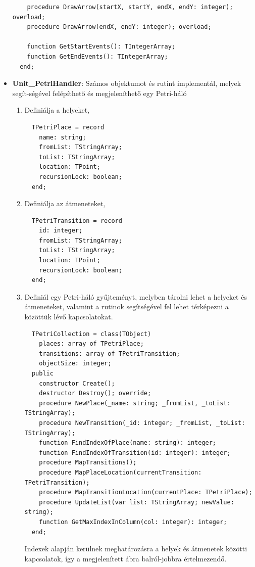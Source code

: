 \begin{itemize}
{\begin{lstlisting}
    procedure DrawArrow(startX, startY, endX, endY: integer); overload;
    procedure DrawArrow(endX, endY: integer); overload;

    function GetStartEvents(): TIntegerArray;
    function GetEndEvents(): TIntegerArray;
  end;

		\end{lstlisting}
	}
	\item{
		\textbf{Unit\_PetriHandler}: Számos objektumot és rutint implementál, melyek segít\hyp{}ségével felépíthető és megjeleníthető egy Petri-háló
		\begin{enumerate}
			\item{Definiálja a helyeket,
				\begin{lstlisting}
  TPetriPlace = record
    name: string;
    fromList: TStringArray;
    toList: TStringArray;
    location: TPoint;
    recursionLock: boolean;
  end;
				\end{lstlisting}
			}
			\item{Definiálja az átmeneteket,
				\begin{lstlisting}
  TPetriTransition = record
    id: integer;
    fromList: TStringArray;
    toList: TStringArray;
    location: TPoint;
    recursionLock: boolean;
  end;
				\end{lstlisting}
			}
			\item{Definiál egy Petri-háló gyűjteményt, melyben tárolni lehet a helyeket és átmeneteket, valamint a rutinok segítségével fel lehet térképezni a közöttük lévő kapcsolatokat.
				\begin{lstlisting}
  TPetriCollection = class(TObject)
    places: array of TPetriPlace;
    transitions: array of TPetriTransition;
    objectSize: integer;
  public
    constructor Create();
    destructor Destroy(); override;
    procedure NewPlace(_name: string; _fromList, _toList: TStringArray);
    procedure NewTransition(_id: integer; _fromList, _toList: TStringArray);
    function FindIndexOfPlace(name: string): integer;
    function FindIndexOfTransition(id: integer): integer;
    procedure MapTransitions();
    procedure MapPlaceLocation(currentTransition: TPetriTransition);
    procedure MapTransitionLocation(currentPlace: TPetriPlace);
    procedure UpdateList(var list: TStringArray; newValue: string);
    function GetMaxIndexInColumn(col: integer): integer;
  end;
				\end{lstlisting}
 Indexek alapján kerülnek meghatározásra a helyek és átmenetek közötti kapcsolatok, így a megjelenített ábra balról-jobbra értelmezendő.
			}
		\end{enumerate}
	}
\end{itemize}